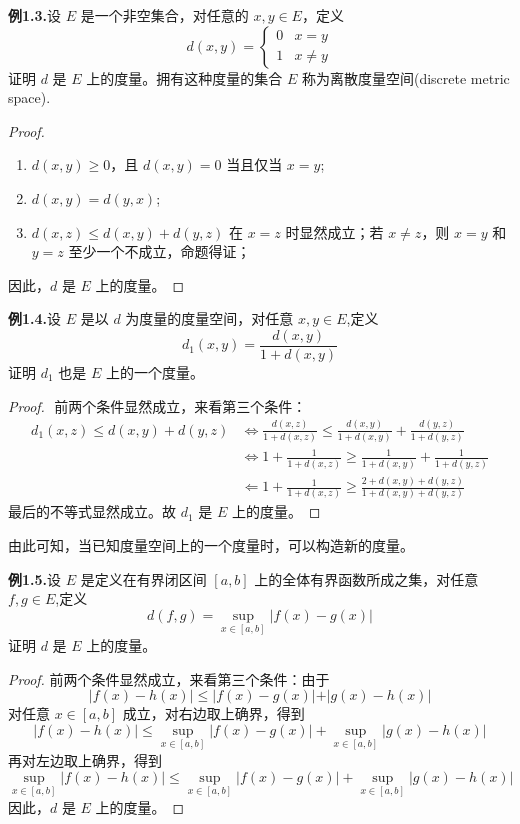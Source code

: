 \documentclass{article}
\begin{document}
\textbf{例1.3.}设 $E$ 是一个非空集合，对任意的 $x,y\in E$，定义
$$d(x,y) = \begin{cases} 0 & x=y \\ 1 & x\neq y \end{cases}$$
证明 $d$ 是 $E$ 上的度量。拥有这种度量的集合 $E$ 称为离散度量空间(discrete metric space).
\begin{proof}
    $ $
    \begin{enumerate}[label={\textbullet}]
        \item $d(x,y) \geq 0$，且 $d(x,y) = 0$ 当且仅当 $x=y$;
        \item $d(x,y) = d(y,x)$;
        \item $d(x,z)\leq d(x,y) + d(y,z)$ 在 $x=z$ 时显然成立；若 $x\neq z$，则 $x=y$ 和 $y=z$ 至少一个不成立，命题得证；
    \end{enumerate}
    因此，$d$ 是 $E$ 上的度量。
\end{proof}

\textbf{例1.4.}设 $E$ 是以 $d$ 为度量的度量空间，对任意 $x,y\in E$,定义
$$d_1(x,y) = \frac{d(x,y)}{1+d(x,y)}$$
证明 $d_1$ 也是 $E$ 上的一个度量。
\begin{proof}
    $ $
前两个条件显然成立，来看第三个条件：
\[\begin{aligned}
    d_1(x,z)\leq d(x, y)+d(y,z) 
& \Longleftrightarrow  \frac{d (x,z)}{1+d(x,z) }\leq \frac{d(x,y) }{1+d(x,y)}+\frac{d(y,z)}{1+d(y,z)} \\
& \Longleftrightarrow   1+\frac{1}{1+d(x,z)}\geq \frac{1}{1+d(x,y)}+\frac{1}{1+d (y,z)} \\
& \Longleftarrow 1+\frac{1}{1+d(x,z)}\geq \frac{2+d(x,y)+d (y,z) }{1+d(x, y)+d(y,z)}
\end{aligned}\]
最后的不等式显然成立。故 $d_1$ 是 $E$ 上的度量。
\end{proof}
由此可知，当已知度量空间上的一个度量时，可以构造新的度量。

\textbf{例1.5.}设 $E$ 是定义在有界闭区间 $[a,b]$ 上的全体有界函数所成之集，对任意 $f,g\in E$,定义
$$d(f,g) = \sup_{x\in [a,b]}|f(x)-g(x)|$$
证明 $d$ 是 $E$ 上的度量。
\begin{proof}
    前两个条件显然成立，来看第三个条件：由于
    $$\vert f(x) - h(x)\vert \leq \vert f(x) - g(x)\vert + \vert g(x) - h(x)\vert$$
    对任意 $x\in [a,b]$ 成立，对右边取上确界，得到
    $$\vert f(x) - h(x)\vert \leq \sup_{x\in [a,b]}|f(x)-g(x)| + \sup_{x\in [a,b]}|g(x)-h(x)|$$
    再对左边取上确界，得到
    $$\sup_{x\in [a,b]}|f(x)-h(x)| \leq \sup_{x\in [a,b]}|f(x)-g(x)| + \sup_{x\in [a,b]}|g(x)-h(x)|$$
    因此，$d$ 是 $E$ 上的度量。
\end{proof}
\end{document}
